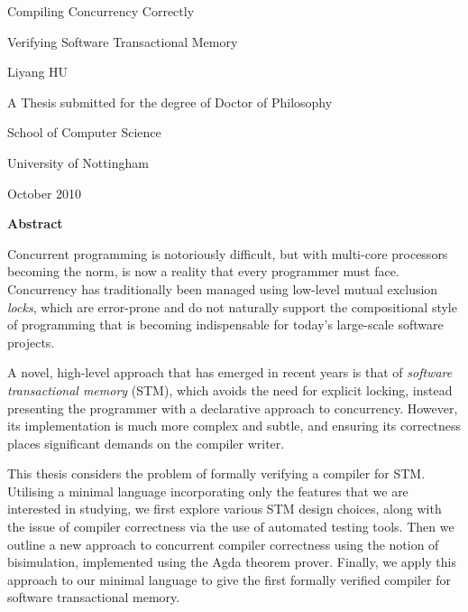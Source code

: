 \documentclass[12pt,twoside,openright]{book}
\begin{document}
\pagestyle{empty}
\begin{titlepage}
\begin{center}
\vspace*{1in}
{\LARGE Compiling Concurrency Correctly}
\par
{\Large Verifying Software Transactional Memory}
\par
\vspace{1.5in}
{\large Liyang HU}
\par
\vfill
A Thesis submitted for the degree of Doctor of Philosophy
\par
\vspace{0.5in}
School of Computer Science
\par
\vspace{0.5in}
University of Nottingham
\par
\vspace{0.5in}
October 2010
\end{center}
\cleardoublepage
\end{titlepage}


\pagestyle{fancy}

\begin{center}
{\large\bf Abstract}
\end{center}

Concurrent programming is notoriously difficult, but with multi-core
processors becoming the norm, is now a reality that every programmer must
face. Concurrency has traditionally been managed using low-level mutual
exclusion \emph{locks}, which are error-prone and do not naturally support
the compositional style of programming that is becoming indispensable for
today's large-scale software projects.

A novel, high-level approach that has emerged in recent years is that of
\emph{software transactional memory} (STM), which avoids the need for
explicit locking, instead presenting the programmer with a declarative
approach to concurrency. However, its implementation is much more complex
and subtle, and ensuring its correctness places significant demands on the
compiler writer.

This thesis considers the problem of formally verifying a compiler for STM.
Utilising a minimal language incorporating only the features that we are
interested in studying, we first explore various STM design choices, along
with the issue of compiler correctness via the use of automated testing
tools. Then we outline a new approach to concurrent compiler correctness
using the notion of bisimulation, implemented using the Agda theorem prover.
Finally, we apply this approach to our minimal language to give the first
formally verified compiler for software transactional memory.
\end{document}
